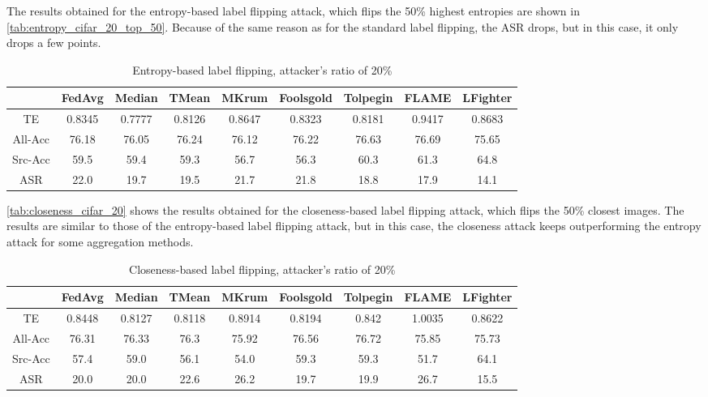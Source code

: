 The results obtained for the entropy-based label flipping attack, which flips the 50\% highest entropies are shown in \autoref{tab:entropy_cifar_20_top_50}. Because of the same reason as for the standard label flipping, the ASR drops, but in this case, it only drops a few points.

\begin{table}[h!]
        \centering
        \small
        \begin{adjustbox}{center}
        \begin{tabular}{|c|c|c|c|c|c|c|c|c|}
            \hline
            & FedAvg & Median & TMean & MKrum & Foolsgold & Tolpegin & FLAME & LFighter \\
            \hline
            TE & 0.8345 & 0.7777 & 0.8126 & 0.8647 & 0.8323 & 0.8181 & 0.9417 & 0.8683 \\
            \hline
            All-Acc & 76.18 & 76.05 & 76.24 & 76.12 & 76.22 & 76.63 & 76.69 & 75.65 \\
            \hline
            Src-Acc & 59.5 & 59.4 & 59.3 & 56.7 & 56.3 & 60.3 & 61.3 & 64.8 \\
            \hline
            ASR & 22.0 & 19.7 & 19.5 & 21.7 & 21.8 & 18.8 & 17.9 & 14.1 \\
            \hline
        \end{tabular}
        \end{adjustbox}
        \caption{Entropy-based label flipping, attacker's ratio of 20\%}
        \label{tab:entropy_cifar_20_top_50}
    \end{table}
    

\autoref{tab:closeness_cifar_20} shows the results obtained for the closeness-based label flipping attack, which flips the 50\% closest images. The results are similar to those of the entropy-based label flipping attack, but in this case, the closeness attack keeps outperforming the entropy attack for some aggregation methods.

\begin{table}[h!]
        \centering
        \small
        \begin{adjustbox}{center}
        \begin{tabular}{|c|c|c|c|c|c|c|c|c|}
            \hline
            & FedAvg & Median & TMean & MKrum & Foolsgold & Tolpegin & FLAME & LFighter \\
            \hline
            TE & 0.8448 & 0.8127 & 0.8118 & 0.8914 & 0.8194 & 0.842 & 1.0035 & 0.8622 \\
            \hline
            All-Acc & 76.31 & 76.33 & 76.3 & 75.92 & 76.56 & 76.72 & 75.85 & 75.73 \\
            \hline
            Src-Acc & 57.4 & 59.0 & 56.1 & 54.0 & 59.3 & 59.3 & 51.7 & 64.1 \\
            \hline
            ASR & 20.0 & 20.0 & 22.6 & 26.2 & 19.7 & 19.9 & 26.7 & 15.5 \\
            \hline
        \end{tabular}
        \end{adjustbox}
        \caption{Closeness-based label flipping, attacker's ratio of 20\%}
        \label{tab:closeness_cifar_20}
    \end{table}

